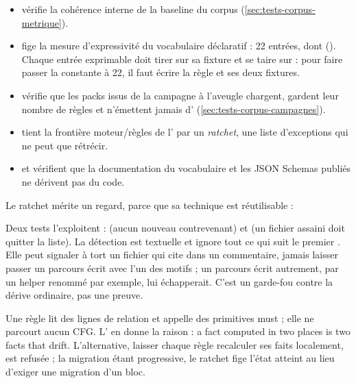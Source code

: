\begin{itemize}
  \item {} vérifie la cohérence interne de la baseline du corpus (\cref{sec:tests-corpus-metrique}).
  \item {} fige la mesure d'expressivité du vocabulaire déclaratif : 22 entrées, dont  (). Chaque entrée exprimable doit tirer sur sa fixture  et se taire sur  : pour faire passer la constante à 22, il faut écrire la règle et ses deux fixtures.
  \item {} vérifie que les packs issus de la campagne à l'aveugle chargent, gardent leur nombre de règles et n'émettent jamais d'\Error{} (\cref{sec:tests-corpus-campagnes}).
  \item {} tient la frontière moteur/règles de l' par un \emph{ratchet}, une liste d'exceptions qui ne peut que rétrécir.
  \item {} et  vérifient que la documentation du vocabulaire et les JSON Schemas publiés ne dérivent pas du code.
\end{itemize}

Le ratchet mérite un regard, parce que sa technique est réutilisable :


Deux tests l'exploitent :  (aucun nouveau contrevenant) et  (un fichier assaini doit quitter la liste). La détection est textuelle et ignore tout ce qui suit le premier . Elle peut signaler à tort un fichier qui cite  dans un commentaire, jamais laisser passer un parcours écrit avec l'un des motifs ; un parcours écrit autrement, par un helper renommé par exemple, lui échapperait. C'est un garde-fou contre la dérive ordinaire, pas une preuve.

\begin{decision}
Une règle lit des lignes de relation et appelle des primitives must ; elle ne parcourt aucun CFG. L' en donne la raison : \og a fact computed in two places is two facts that drift\fg{}. L'alternative, laisser chaque règle recalculer ses faits localement, est refusée ; la migration étant progressive, le ratchet fige l'état atteint au lieu d'exiger une migration d'un bloc.
\end{decision}

